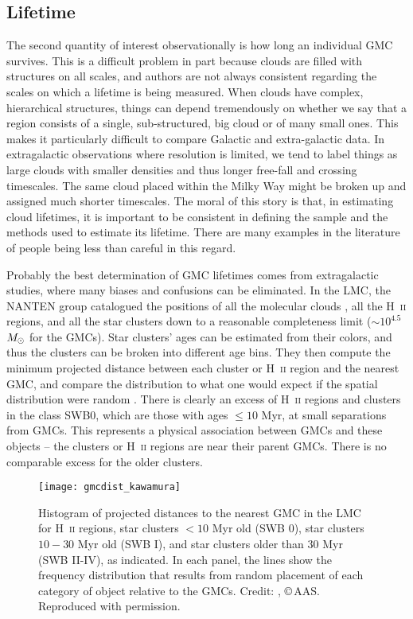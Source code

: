 \subsection{Lifetime}

The second quantity of interest observationally is how long an individual GMC survives. This is a difficult problem in part because clouds are filled with structures on all scales, and authors are not always consistent regarding the scales on which a lifetime is being measured. When clouds have complex, hierarchical structures, things can depend tremendously on whether we say that a region consists of a single, sub-structured, big cloud or of many small ones. This makes it particularly difficult to compare Galactic and extra-galactic data. In extragalactic observations where resolution is limited, we tend to label things as large clouds with smaller densities and thus longer free-fall and crossing timescales. The same cloud placed within the Milky Way might be broken up and assigned much shorter timescales. The moral of this story is that, in estimating cloud lifetimes, it is important to be consistent in defining the sample and the methods used to estimate its lifetime. There are many examples in the literature of people being less than careful in this regard.

Probably the best determination of GMC lifetimes comes from extragalactic studies, where many biases and confusions can be eliminated. In the LMC, the NANTEN group catalogued the positions of all the molecular clouds \citet{fukui08a}, all the H~\textsc{ii} regions, and all the star clusters down to a reasonable completeness limit ($\sim 10^{4.5}$ $M_{\odot}$ for the GMCs). Star clusters' ages can be estimated from their colors, and thus the clusters can be broken into different age bins. They then compute the minimum projected distance between each cluster or H~\textsc{ii} region and the nearest GMC, and compare the distribution to what one would expect if the spatial distribution were random \citet[Figure \ref{fig:gmcdist_kawamura}]{kawamura09a}. There is clearly an excess of H~\textsc{ii} regions and clusters in the class SWB0, which are those with ages $\leq 10$ Myr, at small separations from GMCs. This represents a physical association between GMCs and these objects -- the clusters or H~\textsc{ii} regions are near their parent GMCs. There is no comparable excess for the older clusters. 

\begin{figure}
\texttt{[image: gmcdist\_kawamura]}
\caption[Histogram of distances to nearest GMC]{
\label{fig:gmcdist_kawamura}
Histogram of projected distances to the nearest GMC in the LMC for H~\textsc{ii} regions, star clusters $<10$ Myr old (SWB 0), star clusters $10-30$ Myr old (SWB I), and star clusters older than 30 Myr (SWB II-IV), as indicated. In each panel, the lines show the frequency distribution that results from random placement of each category of object relative to the GMCs. Credit: \citet{kawamura09a}, \copyright\,AAS. Reproduced with permission.
}
\end{figure}

